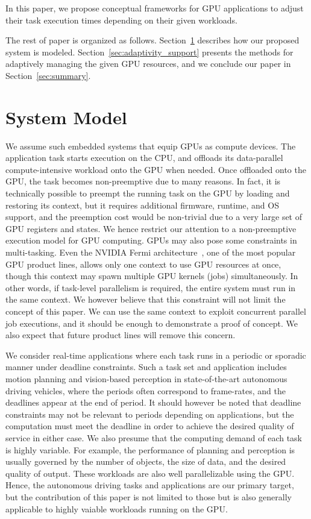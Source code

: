 \documentclass[times, 10pt, twocolumn]{article}
\begin{document}
In this paper, we propose conceptual frameworks for GPU applications to adjust their task execution times depending on their given workloads.

The rest of paper is organized as follows. Section~\ref{sec:system_model} describes how our proposed system is modeled. Section~\ref{sec:adaptivity_support} presents the methods for adaptively managing the given GPU resources, and we conclude our paper in Section~\ref{sec:summary}.

\section{System Model}
\label{sec:system_model}

We assume such embedded systems that equip GPUs as compute devices.
The application task starts execution on the CPU, and offloads its
data-parallel compute-intensive workload onto the GPU when needed.
Once offloaded onto the GPU, the task becomes non-preemptive due to many
reasons.
In fact, it is technically possible to preempt the running task on the
GPU by loading and restoring its context, but it requires additional
firmware, runtime, and OS support, and the preemption cost would be
non-trivial due to a very large set of GPU registers and states.
We hence restrict our attention to a non-preemptive execution model for
GPU computing.
GPUs may also pose some constraints in multi-tasking.
Even the NVIDIA Fermi architecture~\cite{Fermi}, one of the most popular
GPU product lines, allows only one context to use GPU resources at
once, though this context may spawn multiple GPU kernels (jobs)
simultaneously.
In other words, if task-level parallelism is required, the entire system
must run in the same context.
We however believe that this constraint will not limit the concept of
this paper.
We can use the same context to exploit concurrent parallel job
executions, and it should be enough to demonstrate a proof of concept. 
We also expect that future product lines will remove this concern.

We consider real-time applications where each task runs in a periodic or
sporadic manner under deadline constraints.
Such a task set and application includes motion planning and 
vision-based perception in state-of-the-art autonomous driving
vehicles, where the periods often correspond to frame-rates, and the
deadlines appear at the end of period.
It should however be noted that deadline constraints may not be relevant
to periods depending on applications, but the computation must meet the
deadline in order to achieve the desired quality of service in either case.
We also presume that the computing demand of each task is highly
variable.
For example, the performance of planning and perception is usually
governed by the number of objects, the size of data, and the desired
quality of output.
These workloads are also well parallelizable using the GPU.
Hence, the autonomous driving tasks and applications are our primary
target, but the contribution of this paper is not limited to those but
is also generally applicable to highly vaiable workloads running on the
GPU.
\end{document}
